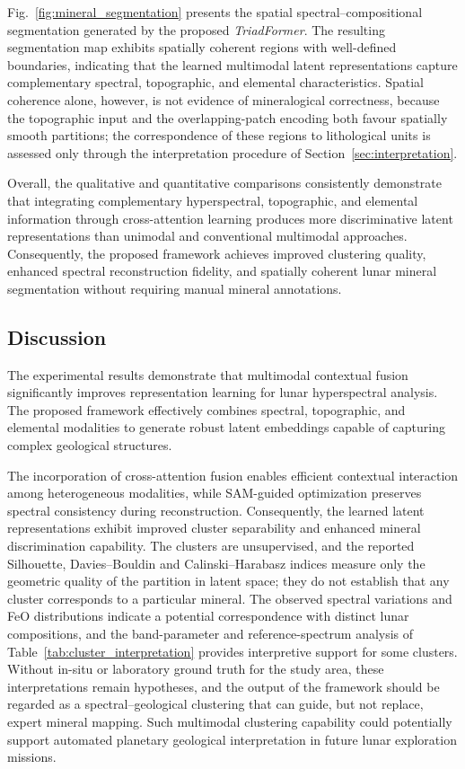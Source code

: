 \documentclass[pdflatex,sn-mathphys-num]{sn-jnl}
\begin{document}
Fig.~\ref{fig:mineral_segmentation} presents the spatial spectral--compositional segmentation generated by the proposed \textit{TriadFormer}. The resulting segmentation map exhibits spatially coherent regions with well-defined boundaries, indicating that the learned multimodal latent representations capture complementary spectral, topographic, and elemental characteristics. Spatial coherence alone, however, is not evidence of mineralogical correctness, because the topographic input and the overlapping-patch encoding both favour spatially smooth partitions; the correspondence of these regions to lithological units is assessed only through the interpretation procedure of Section~\ref{sec:interpretation}.

Overall, the qualitative and quantitative comparisons consistently demonstrate that integrating complementary hyperspectral, topographic, and elemental information through cross-attention learning produces more discriminative latent representations than unimodal and conventional multimodal approaches. Consequently, the proposed framework achieves improved clustering quality, enhanced spectral reconstruction fidelity, and spatially coherent lunar mineral segmentation without requiring manual mineral annotations.
\subsection{Discussion}
\label{sec:discussion}

The experimental results demonstrate that multimodal contextual fusion significantly improves representation learning for lunar hyperspectral analysis. The proposed framework effectively combines spectral, topographic, and elemental modalities to generate robust latent embeddings capable of capturing complex geological structures.

The incorporation of cross-attention fusion enables efficient contextual interaction among heterogeneous modalities, while SAM-guided optimization preserves spectral consistency during reconstruction. Consequently, the learned latent representations exhibit improved cluster separability and enhanced mineral discrimination capability. The clusters are unsupervised, and the reported Silhouette, Davies--Bouldin and Calinski--Harabasz indices measure only the geometric quality of the partition in latent space; they do not establish that any cluster corresponds to a particular mineral. The observed spectral variations and FeO distributions indicate a potential correspondence with distinct lunar compositions, and the band-parameter and reference-spectrum analysis of Table~\ref{tab:cluster_interpretation} provides interpretive support for some clusters. Without in-situ or laboratory ground truth for the study area, these interpretations remain hypotheses, and the output of the framework should be regarded as a spectral--geological clustering that can guide, but not replace, expert mineral mapping. Such multimodal clustering capability could potentially support automated planetary geological interpretation in future lunar exploration missions.
\end{document}
